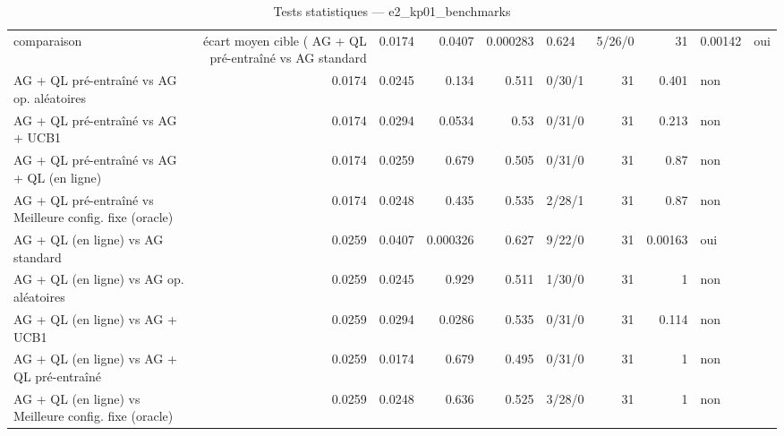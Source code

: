 \begin{table}
\caption{Tests statistiques — e2_kp01_benchmarks}
\label{tab:tests-e2_kp01_benchmarks}
\begin{tabular}{lrrrrlrrl}
\toprule
comparaison & écart moyen cible (%
\midrule
AG + QL pré-entraîné vs AG standard & 0.0174 & 0.0407 & 0.000283 & 0.624 & 5/26/0 & 31 & 0.00142 & oui \\
AG + QL pré-entraîné vs AG op. aléatoires & 0.0174 & 0.0245 & 0.134 & 0.511 & 0/30/1 & 31 & 0.401 & non \\
AG + QL pré-entraîné vs AG + UCB1 & 0.0174 & 0.0294 & 0.0534 & 0.53 & 0/31/0 & 31 & 0.213 & non \\
AG + QL pré-entraîné vs AG + QL (en ligne) & 0.0174 & 0.0259 & 0.679 & 0.505 & 0/31/0 & 31 & 0.87 & non \\
AG + QL pré-entraîné vs Meilleure config. fixe (oracle) & 0.0174 & 0.0248 & 0.435 & 0.535 & 2/28/1 & 31 & 0.87 & non \\
AG + QL (en ligne) vs AG standard & 0.0259 & 0.0407 & 0.000326 & 0.627 & 9/22/0 & 31 & 0.00163 & oui \\
AG + QL (en ligne) vs AG op. aléatoires & 0.0259 & 0.0245 & 0.929 & 0.511 & 1/30/0 & 31 & 1 & non \\
AG + QL (en ligne) vs AG + UCB1 & 0.0259 & 0.0294 & 0.0286 & 0.535 & 0/31/0 & 31 & 0.114 & non \\
AG + QL (en ligne) vs AG + QL pré-entraîné & 0.0259 & 0.0174 & 0.679 & 0.495 & 0/31/0 & 31 & 1 & non \\
AG + QL (en ligne) vs Meilleure config. fixe (oracle) & 0.0259 & 0.0248 & 0.636 & 0.525 & 3/28/0 & 31 & 1 & non \\
\bottomrule
\end{tabular}
\end{table}
